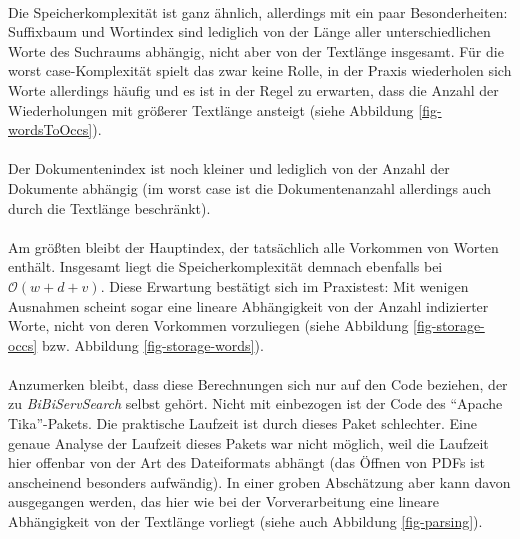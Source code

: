 \paragraph{} Die Speicherkomplexität ist ganz ähnlich, allerdings mit ein paar Besonderheiten: Suffixbaum und Wortindex sind lediglich von der Länge aller unterschiedlichen Worte des Suchraums abhängig, nicht aber von der Textlänge insgesamt. Für die worst case-Komplexität spielt das zwar keine Rolle, in der Praxis wiederholen sich Worte allerdings häufig und es ist in der Regel zu erwarten, dass die Anzahl der Wiederholungen mit größerer Textlänge ansteigt (siehe Abbildung \ref{fig-wordsToOccs}).


\paragraph{} Der Dokumentenindex ist noch kleiner und lediglich von der Anzahl der Dokumente abhängig (im worst case ist die Dokumentenanzahl allerdings auch durch die Textlänge beschränkt).
\paragraph{} Am größten bleibt der Hauptindex, der tatsächlich alle Vorkommen von Worten enthält. Insgesamt liegt die Speicherkomplexität demnach ebenfalls bei $\mathcal{O}(w + d + v)$. Diese Erwartung bestätigt sich im Praxistest: Mit wenigen Ausnahmen scheint sogar eine lineare Abhängigkeit von der Anzahl indizierter Worte, nicht von deren Vorkommen vorzuliegen (siehe Abbildung \ref{fig-storage-occs} bzw. Abbildung \ref{fig-storage-words}).



\paragraph{} Anzumerken bleibt, dass diese Berechnungen sich nur auf den Code beziehen, der zu \textit{BiBiServSearch} selbst gehört. Nicht mit einbezogen ist der Code des "`Apache Tika"'-Pakets. Die praktische Laufzeit ist durch dieses Paket schlechter. Eine genaue Analyse der Laufzeit dieses Pakets war nicht möglich, weil die Laufzeit hier offenbar von der Art des Dateiformats abhängt (das Öffnen von PDFs ist anscheinend besonders aufwändig). In einer groben Abschätzung aber kann davon ausgegangen werden, das hier wie bei der Vorverarbeitung eine lineare Abhängigkeit von der Textlänge vorliegt (siehe auch Abbildung \ref{fig-parsing}).

